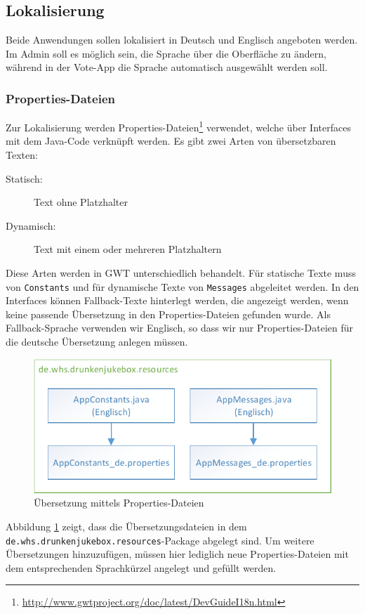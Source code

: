 

\subsection{Lokalisierung}
Beide Anwendungen sollen lokalisiert in Deutsch und Englisch angeboten werden.
Im Admin soll es möglich sein, die Sprache über die Oberfläche zu ändern, während
in der Vote-App die Sprache automatisch ausgewählt werden soll.

\subsubsection{Properties-Dateien}

Zur Lokalisierung werden Properties-Dateien\footnote{\url{http://www.gwtproject.org/doc/latest/DevGuideI18n.html}} verwendet, welche über Interfaces
mit dem Java-Code verknüpft werden. Es gibt zwei Arten von übersetzbaren Texten:
\begin{description}
	\item[Statisch:] Text ohne Platzhalter
	\item[Dynamisch:] Text mit einem oder mehreren Platzhaltern
\end{description}
Diese Arten werden in GWT unterschiedlich behandelt. Für statische Texte muss
von \texttt{Constants} und für dynamische Texte von \texttt{Messages} abgeleitet werden. In den Interfaces können Fallback-Texte hinterlegt werden, die angezeigt werden, wenn keine passende Übersetzung in den Properties-Dateien gefunden wurde. Als
Fallback-Sprache verwenden wir Englisch, so dass wir nur Properties-Dateien für
die deutsche Übersetzung anlegen müssen.

\begin{figure}[tbh]
\centering
\includegraphics[width=0.7\linewidth]{Bilder/Lokalisierung}
\caption{Übersetzung mittels Properties-Dateien}
\label{fig:Lokalisierung}
\end{figure}


Abbildung \ref{fig:Lokalisierung} zeigt, dass die Übersetzungsdateien in dem
\texttt{de.whs.drunkenjukebox.resources}-Package abgelegt sind. Um weitere
Übersetzungen hinzuzufügen, müssen hier lediglich neue Properties-Dateien mit
dem entsprechenden Sprachkürzel angelegt und gefüllt werden.


